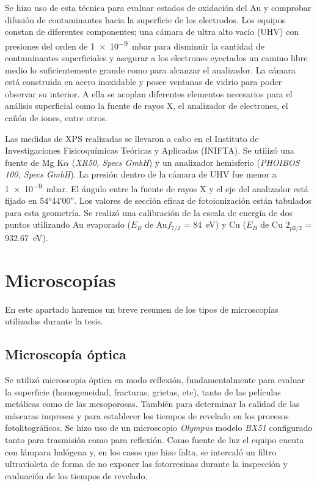 		Se hizo uso de esta técnica para evaluar estados de oxidación del Au y comprobar difusión de contaminantes hacia la superficie de los electrodos.  Los equipos constan de diferentes componentes; una cámara de ultra alto vacío (UHV) con presiones del orden de \SI{1e-9}{mbar} para disminuir la cantidad de contaminantes superficiales y asegurar a los electrones eyectados un camino libre medio lo suficientemente grande como para alcanzar el analizador. La cámara está construida en acero inoxidable y posee ventanas de vidrio para poder observar su interior. A ella se acoplan diferentes elementos necesarios para el análisis superficial como la fuente de rayos X, el analizador de electrones, el cañón de iones, entre otros.\cite{XPS1978,Corthey2012}

		Las medidas de XPS realizadas se llevaron a cabo en el Instituto de Investigaciones Fisicoquímicas Teóricas y Aplicadas (INIFTA). Se utilizó una fuente de Mg K$\alpha$ (\textit{XR50, Specs GmbH}) y un analizador hemisferio (\textit{PHOIBOS 100, Specs GmbH}). La presión dentro de la cámara de UHV fue menor a \SI{1e-9}{mbar}. El ángulo entre la fuente de rayos X y el eje del analizador está fijado en \ang{54;44;00}. Los valores de sección eficaz de fotoionización están tabulados para esta geometría. Se realizó una calibración de la escala de energía de dos puntos utilizando Au evaporado ($E_B$ de Au$f_{7/2}$ = \SI{84}{\electronvolt}) y Cu ($E_B$ de Cu $2_{p3/2}$ = \SI{932.67}{\electronvolt}).
		
\section{Microscopías}\label{sec:micros}
		
	 En este apartado haremos un breve resumen de los tipos de microscopías utilizadas durante la tesis.

	\subsection{Microscopía óptica}

		Se utilizó microscopia óptica en modo reflexión, fundamentalmente para evaluar la superficie (homogeneidad, fracturas, grietas, etc), tanto de las películas metálicas como de las mesoporosas. También para determinar la calidad de las máscaras impresas y para establecer los tiempos de revelado en los procesos fotolitográficos. Se hizo uso de un microscopio \textit{Olympus} modelo \textit{BX51} configurado tanto para trasmisión como para reflexión. Como fuente de luz el equipo cuenta con lámpara halógena y, en los casos que hizo falta, se intercaló un filtro ultravioleta de forma de no exponer las fotorresinas durante la inspección y evaluación de los tiempos de revelado.
	
